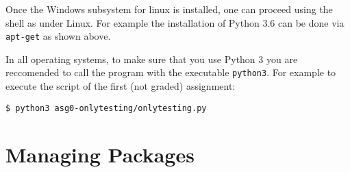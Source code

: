 Once the Windows subsystem for linux is installed, one can proceed using
the shell as under Linux. For example the installation of Python 3.6 can
be done via \lstinline{apt-get} as shown above.

In all operating systems, to make sure that you use Python 3 you are
reccomended to call the program with the
executable \lstinline{python3}. For example to execute the script of the
first (not graded) assignment:

\begin{lstlisting}
$ python3 asg0-onlytesting/onlytesting.py
\end{lstlisting}


\section*{Managing Packages} %

